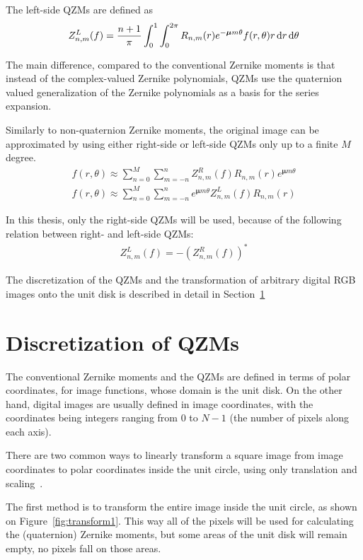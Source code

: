 The left-side QZMs are defined as 
\begin{gather*}
  Z_{n,m}^L(f) = \frac{n + 1}{\pi}\int_0^1\int_0^{2\pi}R_{n,m}(r)e^{-\bm{\mu}m\theta}f(r,\theta)r\dif r\dif\theta
\end{gather*}

The main difference, compared to the conventional Zernike moments is that instead of the complex-valued Zernike polynomials, QZMs use the quaternion valued generalization of the Zernike polynomials as a basis for the series expansion. 

Similarly to non-quaternion Zernike moments, the original image can be approximated by using either right-side or left-side QZMs only up to a finite $M$ degree.
\begin{gather*}
  f(r,\theta) \approx \sum_{n=0}^{M}\sum_{m=-n}^{n}Z_{n,m}^R(f)R_{n,m}(r)e^{\bm{\mu}m\theta} \\
  f(r,\theta) \approx \sum_{n=0}^{M}\sum_{m=-n}^{n}e^{\bm{\mu}m\theta}Z_{n,m}^L(f)R_{n,m}(r)
\end{gather*}

In this thesis, only the right-side QZMs will be used, because of the following relation between right- and left-side QZMs:
\begin{gather*}
  Z_{n,m}^L(f) = -(Z_{n,m}^R(f))^{*}
\end{gather*}

The discretization of the QZMs and the transformation of arbitrary digital RGB images onto the unit disk is described in detail in Section~\ref{sec:discretization} 

\section{Discretization of QZMs}\label{sec:discretization}
The conventional Zernike moments and the QZMs are defined in terms of polar coordinates, for image functions, whose domain is the unit disk. On the other hand, digital images are usually defined in image coordinates, with the coordinates being integers ranging from $0$ to $N - 1$ (the number of pixels along each axis).

There are two common ways to linearly transform a square image from image coordinates to polar coordinates inside the unit circle, using only translation and scaling~\cite{kintner}.

The first method is to transform the entire image inside the unit circle, as shown on Figure~\ref{fig:transform1}. This way all of the pixels will be used for calculating the (quaternion) Zernike moments, but some areas of the unit disk will remain empty, no pixels fall on those areas.

